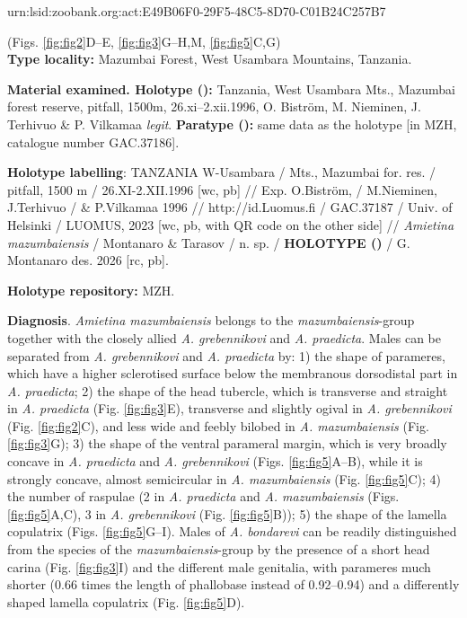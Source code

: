 \documentclass[fleqn,10pt,lineno]{wlpeerj}
\begin{document}
urn:lsid:zoobank.org:act:E49B06F0-29F5-48C5-8D70-C01B24C257B7

(Figs. \ref{fig:fig2}D--E, \ref{fig:fig3}G--H,M, \ref{fig:fig5}C,G)\\

\textbf{Type locality:} Mazumbai Forest, West Usambara Mountains, Tanzania.

\textbf{Material examined. Holotype (\male):} Tanzania, West Usambara Mts., Mazumbai forest reserve, pitfall, 1500m, 26.xi–2.xii.1996, O. Biström, M. Nieminen, J. Terhivuo \& P. Vilkamaa \textit{legit}. \textbf{Paratype (\female):} same data as the holotype [in MZH, catalogue number GAC.37186].

\textbf{Holotype labelling}: TANZANIA W-Usambara / Mts., Mazumbai for. res. / pitfall, 1500 m / 26.XI-2.XII.1996 [wc, pb] // Exp. O.Biström, / M.Nieminen, J.Terhivuo / \& P.Vilkamaa 1996 // http://id.Luomus.fi / GAC.37187 / Univ. of Helsinki / LUOMUS, 2023 [wc, pb, with QR code on the other side] // \textit{Amietina mazumbaiensis} / Montanaro \& Tarasov / n. sp. / \textbf{HOLOTYPE (\male)} / G. Montanaro des. 2026 [rc, pb].

\textbf{Holotype repository:} MZH.

\textbf{Diagnosis}. \textit{Amietina mazumbaiensis} belongs to the \textit{mazumbaiensis}-group together with the closely allied \textit{A. grebennikovi} and \textit{A. praedicta}. Males can be separated from \textit{A. grebennikovi} and \textit{A. praedicta} by: 1) the shape of parameres, which have a higher sclerotised surface below the membranous dorsodistal part in \textit{A. praedicta}; 2) the shape of the head tubercle, which is transverse and straight in \textit{A. praedicta} (Fig. \ref{fig:fig3}E), transverse and slightly ogival in \textit{A. grebennikovi} (Fig. \ref{fig:fig2}C), and less wide and feebly bilobed in \textit{A. mazumbaiensis} (Fig. \ref{fig:fig3}G); 3) the shape of the ventral parameral margin, which is very broadly concave in \textit{A. praedicta} and \textit{A. grebennikovi} (Figs. \ref{fig:fig5}A--B), while it is strongly concave, almost semicircular in \textit{A. mazumbaiensis} (Fig. \ref{fig:fig5}C); 4) the number of raspulae (2 in \textit{A. praedicta} and \textit{A. mazumbaiensis} (Figs. \ref{fig:fig5}A,C), 3 in \textit{A. grebennikovi} (Fig. \ref{fig:fig5}B)); 5) the shape of the lamella copulatrix (Figs. \ref{fig:fig5}G--I). Males of \textit{A. bondarevi} can be readily distinguished from the species of the \textit{mazumbaiensis}-group by the presence of a short head carina (Fig. \ref{fig:fig3}I) and the different male genitalia, with parameres much shorter (0.66 times the length of phallobase instead of 0.92--0.94) and a differently shaped lamella copulatrix (Fig. \ref{fig:fig5}D).
\end{document}
